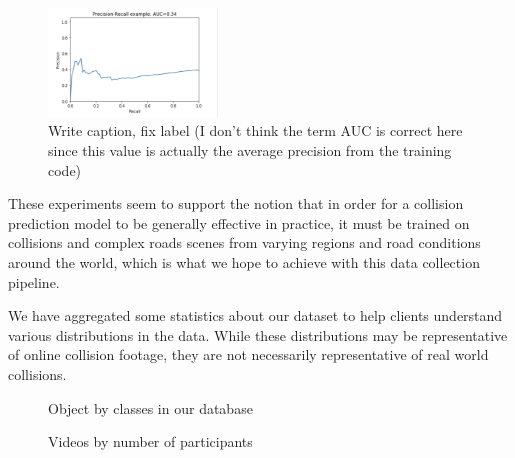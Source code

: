 \documentclass[letterpaper, 10 pt, conference]{IEEEconf}
\newcommand{\todo}[1]{{\color{red}#1}}
\begin{document}
\begin{figure}[htpb]
		\centering
		\includegraphics[width=0.4\textwidth]{prcurve.png}
		\caption{\todo{Write caption, fix label (I don't think the term AUC is correct here since this value is actually the average precision from the training code)}}
		\label{fig:pr_curve}
\end{figure}

These experiments seem to support the notion that in order for a collision prediction model to be generally effective in practice, it must be trained on collisions and complex roads scenes from varying regions and road conditions around the world, which is what we hope to achieve with this data collection pipeline.






\byclass
{}\byactors
{}\byagents
{}\byduration

We have aggregated some statistics about our dataset to help clients understand various distributions in the data. While these distributions may be representative of online collision footage, they are not necessarily representative of real world collisions. 

\begin{figure}[htpb]
		\centering
		\caption{Object by classes in our database}
		\label{fig:obj-by-class}
\end{figure}

\begin{figure}[htpb]
		\centering
		\caption{Videos by number of participants}
		\label{fig:vids-by-participant}
\end{figure}
\end{document}

